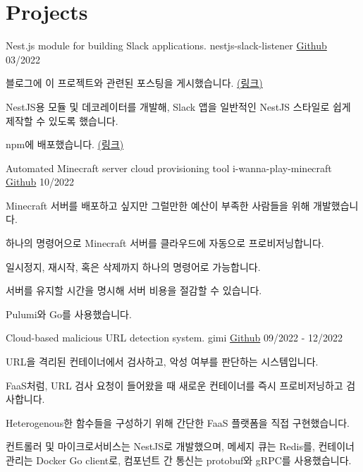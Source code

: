 \section{Projects}

\cventry
{Nest.js module for building Slack applications.}
{nestjs-slack-listener}
{\href{https://github.com/hanchchch/nestjs-slack-listener}{Github}}
{03/2022}
\begin{cvitems}
\item {블로그에 이 프로젝트와 관련된 포스팅을 게시했습니다. \href{https://velog.io/@hanchchch/%EC%A7%84%EC%8B%AC%EC%9C%BC%EB%A1%9C-%EC%97%85%EB%AC%B4-%EC%9E%90%EB%8F%99%ED%99%94-%EC%8A%AC%EB%9E%99%EB%B4%87-%EB%A7%8C%EB%93%A4%EA%B8%B0-1}{(링크)}}
\item {NestJS용 모듈 및 데코레이터를 개발해, Slack 앱을 일반적인 NestJS 스타일로 쉽게 제작할 수 있도록 했습니다.}
\item {npm에 배포했습니다. \href{https://www.npmjs.com/package/nestjs-slack-listener}{(링크)}}
\end{cvitems}

\cventry
{Automated Minecraft server cloud provisioning tool}
{i-wanna-play-minecraft}
{\href{https://github.com/hanchchch/i-wanna-play-minecraft}{Github}}
{10/2022}
\begin{cvitems}
\item {Minecraft 서버를 배포하고 싶지만 그럴만한 예산이 부족한 사람들을 위해 개발했습니다.}
\item {하나의 명령어으로 Minecraft 서버를 클라우드에 자동으로 프로비저닝합니다.}
\item {일시정지, 재시작, 혹은 삭제까지 하나의 명령어로 가능합니다.}
\item {서버를 유지할 시간을 명시해 서버 비용을 절감할 수 있습니다.}
\item {Pulumi와 Go를 사용했습니다.}
\end{cvitems}

\cventry
{Cloud-based malicious URL detection system.}
{gimi}
{\href{https://github.com/hanchchch/gimi}{Github}}
{09/2022 - 12/2022}
\begin{cvitems}
\item {URL을 격리된 컨테이너에서 검사하고, 악성 여부를 판단하는 시스템입니다.}
\item {FaaS처럼, URL 검사 요청이 들어왔을 때 새로운 컨테이너를 즉시 프로비저닝하고 검사합니다.}
\item {Heterogenous한 함수들을 구성하기 위해 간단한 FaaS 플랫폼을 직접 구현했습니다.}
\item {컨트롤러 및 마이크로서비스는 NestJS로 개발했으며, 메세지 큐는 Redis를, 컨테이너 관리는 Docker Go client로, 컴포넌트 간 통신는 protobuf와 gRPC를 사용했습니다.}
\end{cvitems}

